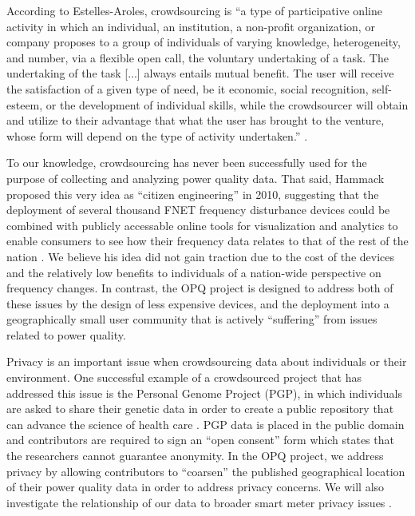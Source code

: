 According to Estelles-Aroles, crowdsourcing is ``a type of participative online activity in which an individual, an institution, a non-profit organization, or company proposes to a group of individuals of varying knowledge, heterogeneity, and number, via a flexible open call, the voluntary undertaking of a task. The undertaking of the task [...] always entails mutual benefit. The user will receive the satisfaction of a given type of need, be it economic, social recognition, self-esteem, or the development of individual skills, while the crowdsourcer will obtain and utilize to their advantage that what the user has brought to the venture, whose form will depend on the type of activity undertaken.'' \cite{Estelles-Aroles2012}.

To our knowledge, crowdsourcing has never been successfully used for the purpose of collecting and analyzing power quality data.  That said, Hammack proposed this very idea as ``citizen engineering'' in 2010, suggesting that the deployment of several thousand FNET frequency disturbance devices could be combined with publicly accessable online tools for visualization and analytics to enable consumers to see how their frequency data relates to that of the rest of the nation \cite{Hammack2010}.   We believe his idea did not gain traction due to the cost of the devices and the relatively low benefits to individuals of a nation-wide perspective on frequency changes.  In contrast, the OPQ project is designed to address both of these issues by the design of less expensive devices, and the deployment into a geographically small user community that is actively ``suffering'' from issues related to power quality.  

Privacy is an important issue when crowdsourcing data about individuals or their environment. One successful example of a crowdsourced project that has addressed this issue is the Personal Genome Project (PGP), in which individuals are asked to share their genetic data in order to create a public repository that can advance the science of health care \cite{Church2005}. PGP data is placed in the public domain and contributors are required to sign an ``open consent'' form which states that the researchers cannot guarantee anonymity. In the OPQ project, we address privacy by allowing contributors to ``coarsen'' the published geographical location of their power quality data in order to address privacy concerns.  We will also investigate the relationship of our data to broader smart meter privacy issues \cite{Balough2011}.

